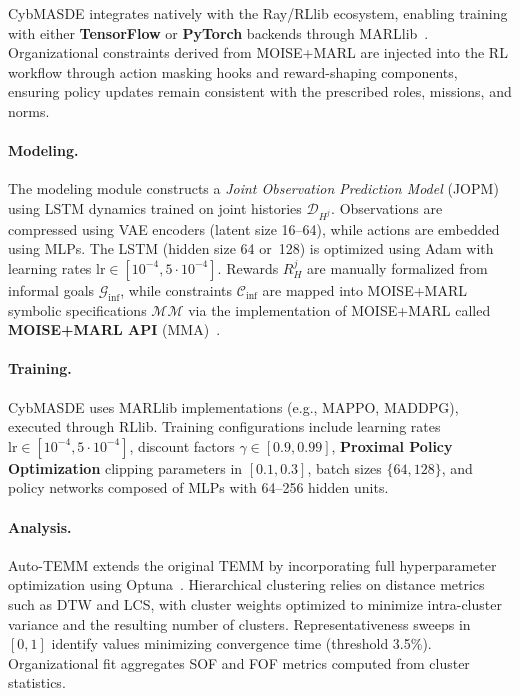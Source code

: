\documentclass[pdflatex,sn-mathphys-num]{sn-jnl}%
\theoremstyle{thmstyleone}%
\theoremstyle{thmstyletwo}%
\theoremstyle{thmstylethree}%
\begin{document}

CybMASDE integrates natively with the Ray/RLlib ecosystem, enabling training with either 
\textbf{TensorFlow} or \textbf{PyTorch} backends through MARLlib~\cite{hu2022marllib}. 
Organizational constraints derived from MOISE+MARL are injected into the RL workflow 
through action masking hooks and reward-shaping components, ensuring policy updates 
remain consistent with the prescribed roles, missions, and norms.

\paragraph*{Modeling.}
The modeling module constructs a \emph{Joint Observation Prediction Model} (JOPM) using LSTM 
dynamics trained on joint histories $\mathcal{D}_{H^j}$. Observations are compressed using VAE 
encoders (latent size 16--64), while actions are embedded using MLPs. The LSTM 
(hidden size 64 or~128) is optimized using Adam with learning rates 
$\text{lr} \in [10^{-4}, 5 \cdot 10^{-4}]$.  
Rewards $R_H^j$ are manually formalized from informal goals $\mathcal{G}_{\text{inf}}$, while 
constraints $\mathcal{C}_{\text{inf}}$ are mapped into MOISE+MARL symbolic specifications 
$\mathcal{MM}$ via the implementation of MOISE+MARL called \textbf{MOISE+MARL API} (MMA)~\cite{soule2025moisemarl}.

\paragraph*{Training.}
CybMASDE uses MARLlib implementations (e.g., MAPPO, MADDPG), executed through RLlib. 
Training configurations include learning rates $\text{lr}\in[10^{-4}, 5\cdot 10^{-4}]$, discount 
factors $\gamma\in[0.9, 0.99]$, \textbf{Proximal Policy Optimization} clipping parameters in $[0.1, 0.3]$, batch sizes 
$\{64,128\}$, and policy networks composed of MLPs with 64--256 hidden units.

\paragraph*{Analysis.}
Auto-TEMM extends the original TEMM by incorporating full hyperparameter optimization using 
Optuna~\cite{akiba2019optuna}. Hierarchical clustering relies on distance metrics such as DTW and LCS, with cluster weights optimized to minimize intra-cluster variance and the resulting number of clusters. 
Representativeness sweeps in $[0,1]$ identify values minimizing convergence time (threshold 
3.5\%). Organizational fit aggregates SOF and FOF metrics computed from cluster statistics.
\end{document}
